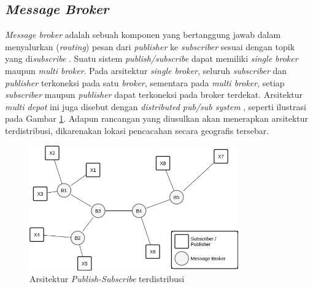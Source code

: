 \subsection{\textit{Message Broker}}
\textit{Message broker} adalah sebuah komponen yang bertanggung jawab dalam menyalurkan (\textit{routing}) pesan dari \textit{publisher} ke \textit{subscriber} sesuai dengan topik yang di\textit{subscribe} \citep{banavar_efficient_1999}. Suatu sistem \textit{publish/subscribe} dapat memiliki \textit{single broker} maupun \textit{multi broker}. Pada arsitektur \textit{single broker}, seluruh \textit{subscriber} dan \textit{publisher} terkoneksi pada satu \textit{broker}, sementara pada \textit{multi broker}, setiap \textit{subscriber} maupun \textit{publisher} dapat terkoneksi pada broker terdekat. Arsitektur \textit{multi depot} ini juga disebut dengan \textit{distributed pub/sub system} \citep{muhl_large-scale_2002}, seperti ilustrasi pada Gambar \ref{fig:pub_sub_distributed_ilustration}. Adapun rancangan yang diusulkan akan menerapkan arsitektur terdistribusi, dikarenakan lokasi pencacahan secara geografis tersebar.


\begin{figure}[!]
	\centering
	\includegraphics[width=9cm]{../../Resources/Images/pub_sub_distributed_ilustration}
	\caption{Arsitektur \textit{Publish-Subscribe} terdistribusi}
	\label{fig:pub_sub_distributed_ilustration}
\end{figure}


